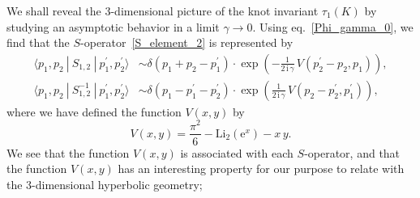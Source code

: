 \documentclass[12pt]{article}
\numberwithin{equation}{section}
\newcommand{\Li}{\mathrm{Li}_2}
\begin{document}
We  shall reveal the 3-dimensional picture  of the knot invariant
$\tau_1(K)$
by studying  an asymptotic behavior in  a limit $\gamma \to 0$.
Using eq.~\eqref{Phi_gamma_0},
we find
that the $S$-operator~\eqref{S_element_2} 
is
represented by
\begin{subequations}
  \label{S_asymptotics}
  \begin{align}
    \langle p_1 , p_2 \ | \ S_{1,2}  \ | \ p_1^\prime , p_2^\prime \rangle
    & \sim
    \delta(p_1 + p_2 - p_1^\prime) \cdot
    \exp
    \left(
      - \frac{1}{2 \, \mathrm{i} \, \gamma}
      \, V(p_2^\prime - p_2 , p_1)
    \right) ,
  \\[2mm]
%
  \langle p_1 , p_2 \  | \ S_{1,2}^{-1} \ | \ p_1^\prime , p_2^\prime \rangle
  &
  \sim
  \delta(p_1 - p_1^\prime - p_2^\prime) \cdot
  \exp
  \left(
    \frac{1}{ 2 \, \mathrm{i} \, \gamma} \,
    V(p_2 - p_2^\prime , p_1^\prime)
  \right) ,
\end{align}
\end{subequations}
where we have defined  the function $V(x,y)$ by
\begin{equation}
  V(x,y)
  =
  \frac{\pi^2}{6} - \Li(\mathrm{e}^x) - x \, y .
\end{equation}
We see that the function $V(x,y)$ is associated with each
$S$-operator, and that
the function $V(x,y)$ has an interesting property for our purpose to
relate with the 3-dimensional hyperbolic geometry;
\end{document}
